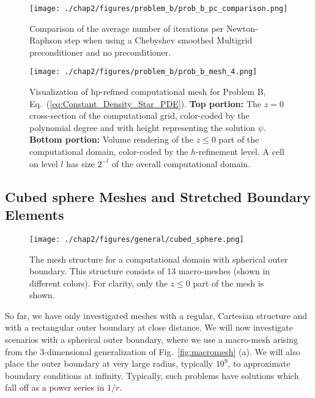 \begin{figure}[ht!]
  \centering
  \texttt{[image: ./chap2/figures/problem\_b/prob\_b\_pc\_comparison.png]}
  \caption{Comparison of the average number of iterations per Newton-Raphson step when using a Chebyshev smoothed Multigrid preconditioner and no preconditioner.}
  \label{fig:problem_b_pc_comparison} 
\end{figure}


\begin{figure}[ht!]
  \centering
  \texttt{[image: ./chap2/figures/problem\_b/prob\_b\_mesh\_4.png]}
  \caption{ \label{fig:problem_b_mesh} Visualization of
      hp-refined computational mesh for Problem B,
      Eq.~(\ref{eq:Constant_Density_Star_PDE}).  {\bf Top portion:}
      The $z=0$ cross-section of the computational grid, color-coded
      by the polynomial degree and with height representing the
      solution $\psi$.  {\bf Bottom portion:} Volume rendering of the
      $z\le 0$ part of the computational domain, color-coded by the
      $h$-refinement level.  A cell on level $l$ has size $2^{-l}$ of
      the overall computational domain. }
\end{figure}

%


\subsection{Cubed sphere Meshes and Stretched Boundary Elements}
  \label{sec:CompactifiedLorentizan}

\begin{figure}[ht!]
  \centering
  \texttt{[image: ./chap2/figures/general/cubed\_sphere.png]}
  \caption{
The mesh structure for a computational domain with spherical outer boundary.  This structure consists of 13 macro-meshes (shown in different colors).  For clarity, only the $z\le 0$ part of the mesh is shown. }
  \label{fig:cubed_sphere_mesh}
\end{figure}

So far, we have only investigated meshes with a regular,
  Cartesian structure and with a rectangular outer boundary at close
  distance.  We will now investigate scenarios with a spherical outer
  boundary, where we use a macro-mesh arising from the 3-dimensional
  generalization of Fig.~\ref{fig:macromesh} (a).  We will also place
  the outer boundary at very large radius, typically $10^9$, to
  approximate boundary conditions at infinity. Typically, such problems have solutions which fall off as a
power series in $1/r$.

